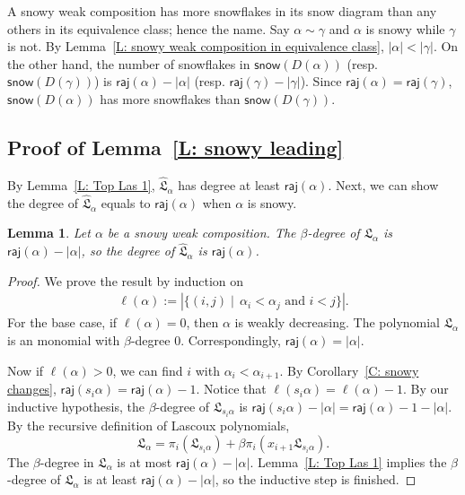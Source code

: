 \documentclass[10pt]{amsart}
\theoremstyle{plain}
\theoremstyle{plain}
\theoremstyle{definition}
\theoremstyle{definition}
\theoremstyle{definition}
\theoremstyle{plain}
\theoremstyle{plain}
\theoremstyle{plain}
\newtheorem{lemma}[lemma]{Lemma}
\theoremstyle{plain}
\theoremstyle{plain}
\theoremstyle{remark}
\theoremstyle{remark}
\theoremstyle{plain}
\theoremstyle{plain}
\newcommand{\fL}{\mathfrak{L}}
\newcommand{\fLb}{\fL}
\newcommand{\topLas}{\widehat{\fL}}
\newcommand{\snow}{\mathsf{snow}}
\newcommand{\raj}{\mathsf{raj}}
\begin{document}
A snowy weak composition has more snowflakes in its snow diagram 
than any others in its equivalence class; hence the name.
Say $\alpha \sim \gamma$ and
$\alpha$ is snowy while $\gamma$ is not. 
By Lemma~\ref{L: snowy weak composition in equivalence class}, $|\alpha| <  |\gamma|$.
On the other hand, 
the number of snowflakes in $\snow(D(\alpha))$ 
(resp. $\snow(D(\gamma))$)
is $\raj(\alpha) - |\alpha|$ (resp. $\raj(\gamma) - |\gamma|$). 
Since $\raj(\alpha) = \raj(\gamma)$, $\snow(D(\alpha))$
has more snowflakes than $\snow(D(\gamma))$.

\subsection{Proof of Lemma~\ref{L: snowy leading}}
\label{SS: snowy}

By Lemma~\ref{L: Top Las 1},
$\topLas_\alpha$ has degree at least $\raj(\alpha)$.
Next, we can show the degree of $\topLas_\alpha$
equals to $\raj(\alpha)$ when $\alpha$ is snowy. 

\begin{lemma}
\label{L: Snowy degree}
Let $\alpha$ be a snowy weak composition.
The $\beta$-degree of $\fLb_\alpha$ 
is $\raj(\alpha) - |\alpha|$,
so the degree of $\topLas_\alpha$ is $\raj(\alpha)$.
\end{lemma}
\begin{proof}
We prove the result by induction on 
\begin{align*}
\ell(\alpha) := |\{(i,j) \mid\, \alpha_i < \alpha_j \text{ and } i < j\}|.
\end{align*}
For the base case, if $\ell(\alpha) = 0$,
then $\alpha$ is weakly decreasing.
The polynomial $\fLb_\alpha$ is an monomial with $\beta$-degree $0$.
Correspondingly, $\raj(\alpha) = |\alpha|$.

Now if $\ell(\alpha) > 0$,
we can find $i$ with $\alpha_i < \alpha_{i+1}$.
By Corollary~\ref{C: snowy changes},
$\raj(s_i \alpha) = \raj(\alpha) - 1$.
Notice that $\ell(s_i \alpha) = \ell(\alpha) - 1$.
By our inductive hypothesis, 
the $\beta$-degree of $\fLb_{s_i \alpha}$
is $\raj(s_i \alpha) - |\alpha| = \raj(\alpha) - 1 - |\alpha|$.
By the recursive definition of Lascoux polynomials,
$$
\fLb_\alpha 
= \pi_i(\fLb_{s_i\alpha}) + \beta \pi_i(x_{i+1}\fLb_{s_i\alpha}).
$$
The $\beta$-degree in $\fLb_\alpha$
is at most $\raj(\alpha) - |\alpha|$.
Lemma~\ref{L: Top Las 1} implies the 
$\beta$-degree of $\fLb_\alpha$ is at least 
$\raj(\alpha) - |\alpha|$,
so the inductive step is finished.
\end{proof}
\end{document}
